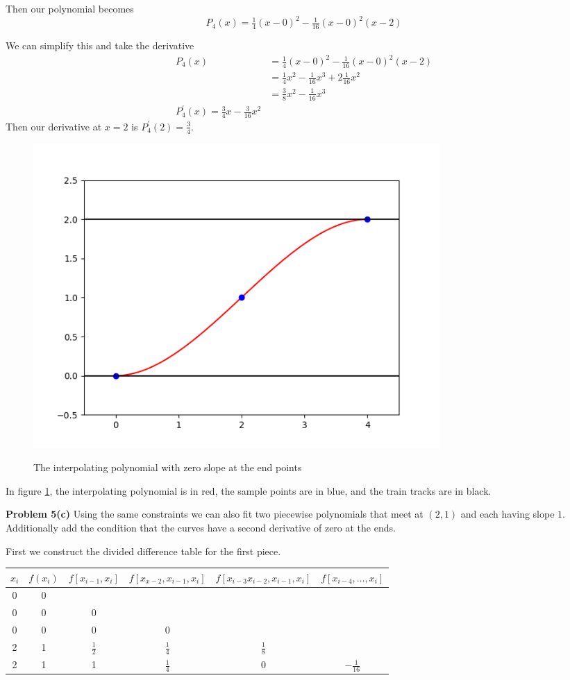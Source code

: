 \documentclass[12pt]{article}
\newcommand{\problem}[1]{\hspace{-4 ex} \large \textbf{Problem #1} }
\begin{document}
	Then our polynomial becomes
	$$
	P_4(x) = \tfrac{1}{4}(x-0)^2 - \tfrac{1}{16}(x-0)^2(x-2)
	$$
	
	We can simplify this and take the derivative
	\begin{align*}
		P_4(x) & = \tfrac{1}{4}(x-0)^2 - \tfrac{1}{16}(x-0)^2(x-2) \\
		& = \tfrac{1}{4}x^2 - \tfrac{1}{16}x^3 + 2\tfrac{1}{16}x^2 \\
		& = \tfrac{3}{8}x^2 - \tfrac{1}{16}x^3\\
		P_4^\prime(x) = \tfrac{3}{4}x - \tfrac{3}{16}x^2
	\end{align*}
	Then our derivative at $x=2$ is $P_4^\prime(2) = \tfrac{3}{4}$.

	\begin{figure}[H]
		\caption{The interpolating polynomial with zero slope at the end points}
		\includegraphics[width=0.75\textwidth]{hw4_figure_6}
		\centering
		\label{fig:p5b}
	\end{figure}
	In figure \ref{fig:p5b}, the interpolating polynomial is in red, the sample points are in blue, and the train tracks are in black. \bigbreak
	
\problem{5(c)} Using the same constraints we can also fit two piecewise polynomials that meet at $(2,1)$ and each having slope $1$. Additionally add the condition that the curves have a second derivative of zero at the ends.

	First we construct the divided difference table for the first piece.
	\begin{center}
		\begin{tabular}{|c|c|c|c|c|c|}\hline
			$x_i$ & $f(x_i)$ & $f[x_{i-1},x_i]$ & $f[x_{x-2}, x_{i-1}, x_i]$ & $f[ x_{i-3}x_{i-2}, x_{i-1}, x_i]$ & $f[ x_{i-4},\dots, x_i]$ \\ \hline
			0 & 0 & & & & \\ \hline
			0 & 0 & 0 & & & \\ \hline
			0 & 0 & 0 & 0 & & \\ \hline
			2 & 1 & $\tfrac{1}{2}$ & $\tfrac{1}{4}$ & $\tfrac{1}{8}$ & \\ \hline
			2 & 1 & 1 &  $\tfrac{1}{4}$ & 0 & $-\tfrac{1}{16}$ \\ \hline
		\end{tabular}
	\end{center}
	
\end{document}
